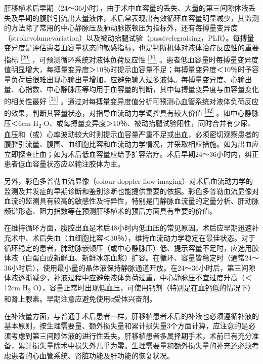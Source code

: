 肝移植术后早期（24～36小时），由于术中血容量的丢失、大量的第三间隙体液丢失及早期的腹腔引流出大量液体，术后常表现出有效循环血容量明显减少，其监测的方法除了常用的中心静脉压及肺动脉嵌顿压为指标外，还有每搏量变异度（strokevolumevariation）以及被动抬腿试验（passivelegraising，PLR）。每搏量变异度是评估患者血容量状态的敏感指标，也是判断机体对液体治疗反应性的重要指标
\protect\hyperlink{text00020.htmlux5cux23ch29-19}{\textsuperscript{{[}29{]}}}
，可预测循环系统对液体负荷反应性
\protect\hyperlink{text00020.htmlux5cux23ch30-19}{\textsuperscript{{[}30{]}}}
。患者低血容量时每搏量变异度值明显增大，每搏量变异度＞10％时提示血容量不足；每搏量变异度＜10％时予容量负荷后很难出现心输出量增加，应避免输入过多液体。每搏量变异度、心输出量、心指数、中心静脉压等均用于血容量的判断，其中每搏量变异度与血容量变化的相关性最好
\protect\hyperlink{text00020.htmlux5cux23ch31-19}{\textsuperscript{{[}31{]}}}
。通过对每搏量变异度值分析可预测心血管系统对液体负荷反应的效果，判断其容量状态，对指导血流动力学调控具有较大价值
\protect\hyperlink{text00020.htmlux5cux23ch32-19}{\textsuperscript{{[}32{]}}}
。如中心静脉压＜6cm H\textsubscript{2}
O、或每搏量变异度＞10％、被动抬腿试验阳性，同时合并有少尿、血压和（或）心率波动较大时则提示血容量严重不足或出血，必须密切观察患者的腹腔引流量、腹围、血细胞比容和血流动力学情况，并采取相应措施。如为出血应立即探查止血；如为术后低血容量应给予扩容治疗。术后早期24～36小时内，纠正患者低血容量状态应以输注胶体为主。

另外，彩色多普勒血流显像（colour doppler flow
imaging）对术后血流动力学的监测及并发症的早期诊断和鉴别诊断也能提供重要的依据。彩色多普勒血流显像对血流的监测具有较高的敏感性及特异性，特别是门静脉血流量的定量分析、肝动脉频谱形态、阻力指数等在预测肝移植术的预后方面具有重要的价值。

在维持循环方面，腹腔出血是术后48小时内低血压的常见原因。术后应早期迅速补充术中、术后失血（血细胞比容＜30％），维持血流动力学稳定在最佳状态。对于循环稳定的患者，肺动脉嵌顿压（或中心静脉压）低、提示容量不足时，应选用胶体液（白蛋白或新鲜血、新鲜冰冻血浆）扩容。在循环、容量皆稳定时（通常24～36小时后），使用最小量的晶体液保持静脉通道开放。在24～36小时后，第三间隙体液逐渐减少，补液过程中应避免液体负荷过重，中心静脉压不宜过度升高（＜12cm
H\textsubscript{2}
O），容量正常时出现低血压，可使用钙剂（特别是在血钙低的情况下）和肾上腺素。早期注意应避免使用α受体兴奋剂。

在补液量方面，与普通手术后患者一样，肝移植患者术后的补液也必须遵循补液的基本原则，按生理需要量、额外损失量和累计损失量3个方面计算，应注意的是必须考虑到第三间隙体液的进行性丢失。肝移植患者多属择期手术，术前已有充分准备，累计损失量除术中损失外几乎为零。生理需要量和额外损失量的补充还必须考虑患者的心血管系统、肾脏功能及肝功能的恢复状况。

